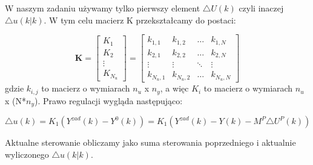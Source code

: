 W naszym zadaniu używamy tylko pierwszy element $\triangle U(k)$ czyli inaczej $\triangle u(k|k)$. W tym celu macierz K przekształcamy do postaci:

\begin{equation}
	\boldsymbol{K}=\left[
	\begin{array}{c}
	K_1\\
	K_2\\
	\vdots\\
	K_{N_u}
	\end{array}
	\right]=\left[
	\begin{array}
	{cccc}
	k_{1,1} & k_{1,2} & \ldots & k_{1,N}\\
	k_{2,1} & k_{2,2} & \ldots & k_{2,N}\\
	\vdots & \vdots & \ddots & \vdots\\
	k_{N_u,1} & k_{N_u,2} & \ldots & k_{N_u,N}
	\end{array}
	\right]
\end{equation}
gdzie $k_{i,j}$ to macierz o wymiarach $n_u$ x $n_y$, a więc $K_i$ to macierz o wymiarach $n_u$ x (N*$n_y$). Prawo regulacji wygląda następująco:

\begin{equation}
	\triangle u(k)=K_1(Y^{zad}(k)-Y^0(k))=K_1(Y^{zad}(k)-Y(k)-M^P\triangle U^P(k))
\end{equation}


Aktualne sterowanie obliczamy jako suma sterowania poprzedniego i aktualnie wyliczonego $\triangle u(k|k)$.


